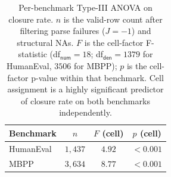 \begin{table}[!htbp]
\centering
\caption{Per-benchmark Type-III ANOVA on closure rate. $n$ is the valid-row count after filtering parse failures ($J = -1$) and structural NAs. $F$ is the cell-factor F-statistic (df$_{\textsf{num}} = 18$; df$_{\textsf{den}} = 1379$ for HumanEval, $3506$ for MBPP); $p$ is the cell-factor p-value within that benchmark. Cell assignment is a highly significant predictor of closure rate on both benchmarks independently.}
\label{tab:per_benchmark}
\begin{tabular}{@{}lccc@{}}
\toprule
Benchmark & $n$ & $F$ (cell) & $p$ (cell) \\
\midrule
HumanEval & $1{,}437$ & $4.92$ & $< 0.001$ \\
MBPP      & $3{,}634$ & $8.77$ & $< 0.001$ \\
\bottomrule
\end{tabular}
\end{table}
